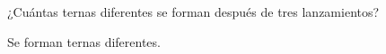 ¿Cuántas ternas diferentes se forman después de tres lanzamientos?

Se forman \fillin[3] ternas diferentes.